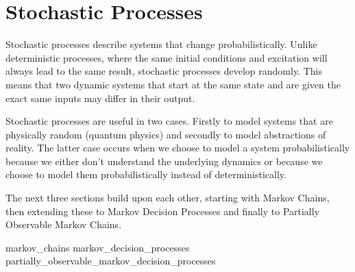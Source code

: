 \section{Stochastic Processes}

Stochastic processes describe systems that change probabilistically. Unlike deterministic processes, where the same initial conditions and excitation will always lead to the same result, stochastic processes develop randomly. This means that two dynamic systems that start at the same state and are given the exact same inputs may differ in their output.

Stochastic processes are useful in two cases. Firstly to model systems that are physically random (quantum physics) and secondly to model abstractions of reality. The latter case occurs when we choose to model a system probabilistically because we either don't understand the underlying dynamics or because we choose to model them probabilistically instead of deterministically.

The next three sections build upon each other, starting with Markov Chains, then extending these to Markov Decision Processes and finally to Partially Observable Markov Chains.

{markov_chains}
{markov_decision_processes}
{partially_observable_markov_decision_processes}
    